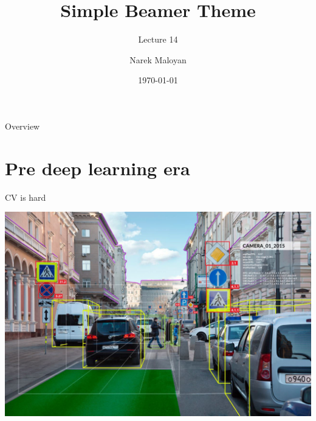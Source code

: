 \documentclass[aspectratio=169,xcolor=dvipsnames]{beamer}
\title[short title]{Simple Beamer Theme}
\subtitle{Lecture 14}
\author[Narek Maloyan] {Narek Maloyan}
\institute[NTU] %
{
    Faculty of Computational Mathematics and Cybernetics \\
    Lomonosov Moscow State University
    \vskip 3pt
}
\date{\today} %
\begin{document}
\begin{frame}
    \titlepage
\end{frame}

\begin{frame}{Overview}
    \tableofcontents
\end{frame}

\section{Pre deep learning era}

\begin{frame}{CV is hard}
    \begin{center}
        \includegraphics[width=\textheight]{../images/moscow.jpeg}
    \end{center}
\end{frame}
\end{document}
